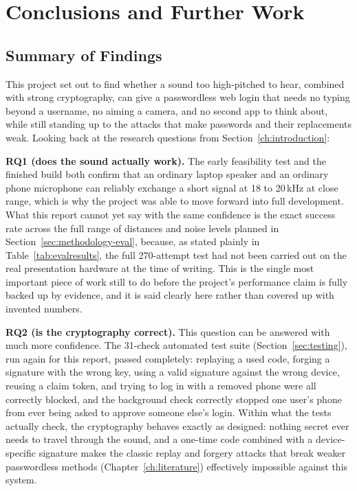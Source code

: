 \chapter{Conclusions and Further Work}
\label{ch:conclusion}

\section{Summary of Findings}
\label{sec:conclusion-findings}

This project set out to find whether a sound too high-pitched to hear,
combined with strong cryptography, can give a passwordless web login that
needs no typing beyond a username, no aiming a camera, and no second app
to think about, while still standing up to the attacks that make
passwords and their replacements weak. Looking back at the research
questions from Section~\ref{ch:introduction}:

\textbf{RQ1 (does the sound actually work).} The early feasibility test
and the finished build both confirm that an ordinary laptop speaker and an
ordinary phone microphone can reliably exchange a short signal at
18 to 20\,kHz at close range, which is why the project was able to move
forward into full development. What this report cannot yet say with the
same confidence is the exact success rate across the full range of
distances and noise levels planned in Section~\ref{sec:methodology-eval},
because, as stated plainly in Table~\ref{tab:evalresults}, the full
270-attempt test had not been carried out on the real presentation
hardware at the time of writing. This is the single most important piece
of work still to do before the project's performance claim is fully
backed up by evidence, and it is said clearly here rather than covered up
with invented numbers.

\textbf{RQ2 (is the cryptography correct).} This question can be answered
with much more confidence. The 31-check automated test suite
(Section~\ref{sec:testing}), run again for this report, passed completely:
replaying a used code, forging a signature with the wrong key, using a
valid signature against the wrong device, reusing a claim token, and
trying to log in with a removed phone were all correctly blocked, and the
background check correctly stopped one user's phone from ever being asked
to approve someone else's login. Within what the tests actually check, the
cryptography behaves exactly as designed: nothing secret ever needs to
travel through the sound, and a one-time code combined with a
device-specific signature makes the classic replay and forgery attacks
that break weaker passwordless methods (Chapter~\ref{ch:literature})
effectively impossible against this system.

